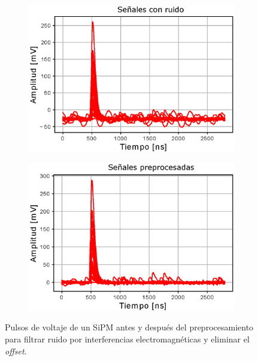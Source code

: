 \begin{figure}[h!]
     \centering
     \begin{subfigure}[b]{0.48\textwidth}
         \centering
         \includegraphics[width=\textwidth]{Images/Pulse_noise.eps}
         \caption{}
         \label{fig:PulsesNoise1}
     \end{subfigure}
     \begin{subfigure}[b]{0.48\textwidth}
         \centering
         \includegraphics[width=\textwidth]{Images/Pulse_filter.eps}
         \caption{}
         \label{fig:PulsesNoise2}
     \end{subfigure}
        \caption{Pulsos de voltaje de un SiPM antes y después del preprocesamiento para filtrar ruido por interferencias electromagnéticas y eliminar el \textit{offset}.}
        \label{fig:PulsesNoise}
\end{figure}

